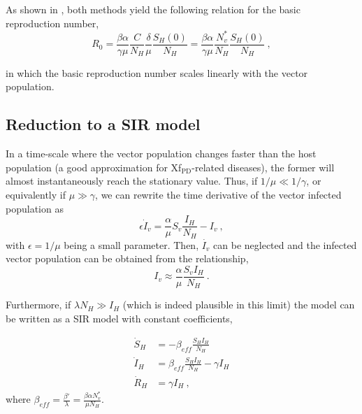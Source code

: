 As shown in \cite{GimenezRomero2022_PRE}, both methods yield the following
relation for the basic reproduction number,
\begin{equation}
    R_0 = \frac{\beta \alpha}{\gamma
        \mu}\frac{C}{N_H}\frac{\delta}{\mu}\frac{S_H(0)}{N_H}=\frac{\beta
        \alpha}{\gamma \mu}\frac{N_v^*}{N_H}\frac{S_H(0)}{N_H}\ ,
\end{equation}

in which the basic reproduction number scales linearly with the vector
population.

\subsection{Reduction to a SIR model}

In a time-scale where the vector population changes faster than the host
population (a good approximation for Xf$_{\textrm{PD}}$-related diseases), the
former will almost instantaneously reach the stationary value. Thus, if
$1/\mu\ll1/\gamma$, or equivalently if $\mu\gg\gamma$, we can rewrite the time
derivative of the vector infected population as
\begin{equation}
    \epsilon\dot{I}_v=\frac{\alpha}{\mu}S_v\frac{I_H}{N_H} - I_v \ ,
\end{equation}
with $\epsilon=1/\mu$ being a small parameter. Then, $\dot{I_v}$ can be
neglected and the infected vector population can be obtained from the
relationship,
\begin{equation}\label{eq:Iv_timescale_approx}
    I_v\approx\frac{\alpha}{\mu}\frac{S_v I_H}{N_H} \ .
\end{equation}

Furthermore, if $\lambda N_H \gg I_H$ (which is indeed plausible in this
limit) the model can be written as a SIR model with constant coefficients,

\begin{equation}\label{eq:SIR}
    \begin{aligned}
        \dot{S}_H & =-\beta_{eff}\frac{S_HI_H}{N_H}            \\
        \dot{I}_H & =\beta_{eff}\frac{S_HI_H}{N_H}- \gamma I_H \\
        \dot{R}_H & =\gamma I_H \ ,
    \end{aligned}
\end{equation}
where $\displaystyle\beta_{eff}=\frac{\beta'}{\lambda}=\frac{\beta\alpha
        N_v^*}{\mu N_H}$.\\

